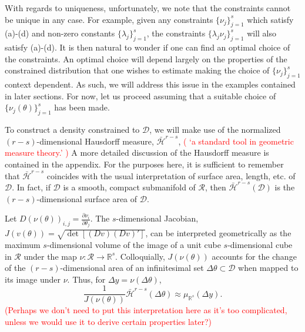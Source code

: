 \documentclass[12 point]{article}
\newcommand{\leo}[1]{\textcolor{red}{ (#1)}}
\begin{document}
With regards to uniqueness, unfortunately, we note that the constraints cannot be unique in any case.  For example, given any constraints $\{\nu_{j}\}_{j=1}^s$ which satisfy (a)-(d) and non-zero constants $\{\lambda_j\}_{j=1}^s$, the constraints $\{\lambda_j \nu_j\}_{j=1}^s$ will also satisfy (a)-(d). It is then natural to wonder if one can find an optimal choice of the  constraints. An optimal choice will depend largely on the properties of the constrained distribution that one wishes to estimate making the choice of $\{\nu_j\}_{j=1}^s$ context dependent.  As such, we will address this issue in the examples contained in later sections. For now, let us proceed assuming that a suitable choice of $\{\nu_j(\theta)\}_{j=1}^s$ has been made.

To construct a density constrained to $\mathcal{D}$, we will make use of the normalized $(r-s)$-dimensional Hausdorff measure, $\bar{\mathcal{H}}^{r-s}$,
\leo{ `a standard tool in geometric measure theory.' }
  A more detailed discussion of the Hausdorff measure is contained in the appendix.  For the purposes here, it is sufficient to remember that $\bar{\mathcal{H}}^{r-s}$ coincides with the usual interpretation of surface area, length, etc. of $\mathcal{D}.$  In fact, if $\mathcal{D}$ is a smooth, compact submanifold of $\mathcal{R}$, then $\bar{\mathcal{H}}^{r-s}(\mathcal{D})$ is the $(r-s)$-dimensional surface area of $\mathcal{D}.$  

Let $D(\nu(\theta))_{i,j}=\frac{\partial \nu_i}{\partial \theta_j}.$ The $s$-dimensional Jacobian, $J(v(\theta)) = \sqrt{\det[(Dv)(Dv)']}$, can be interpreted geometrically as the maximum $s$-dimensional volume of the image of a unit cube $s$-dimensional cube in $\mathcal{R}$ under the map $\nu:\mathcal{R} \to \mathbb{R}^s.$ Colloquially, $J(\nu(\theta))$ accounts for the change of the $(r-s)$-dimensional area of an infinitesimal set $\Delta \theta \subset \mathcal {D}$ when mapped to its image under $\nu$.  Thus, for $\Delta y =\nu (\Delta \theta)$, $$\frac{1}{J(\nu(\theta))}\bar{\mathcal{H}}^{r-s}(\Delta \theta) \approx  \mu_{\mathbb{R}^s}(\Delta y). $$  \leo{Perhaps we don't
need to put this interpretation here as it's too complicated, unless we
would use it to derive certain properties later?}
\end{document}
